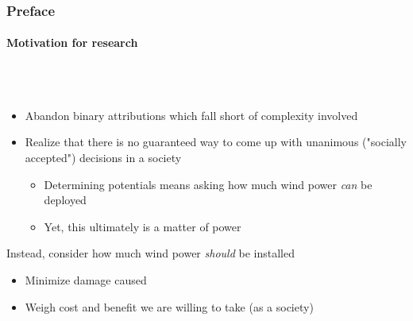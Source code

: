 \documentclass[aspectratio=1610, xcolor=dvipsnames]{beamer}
\begin{document}
    \begin{frame}
        \frametitle{Preface}
        \framesubtitle{Motivation for research}
         \\~\\
        \begin{itemize}
            \item Abandon binary attributions which fall short of complexity involved
            \item Realize that there is no guaranteed way to come up with unanimous ("socially accepted") decisions in a society
            \begin{itemize}
                \item Determining potentials means asking how much wind power \emph{can} be deployed
                \item Yet, this ultimately is a matter of power
            \end{itemize}
        \end{itemize}
        \medskip
        Instead, consider how much wind power \emph{should} be installed
        \begin{itemize}
            \item Minimize damage caused
            \item Weigh cost and benefit we are willing to take (as a society)
        \end{itemize}
    \end{frame}
\end{document}
